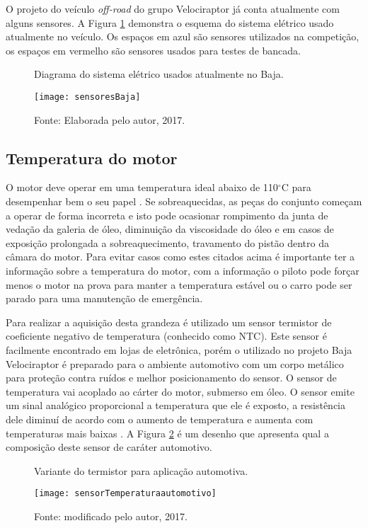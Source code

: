 O projeto do veículo \textit{off-road} do grupo Velociraptor já conta atualmente com alguns sensores. A Figura \ref{fig:sensoresBaja} demonstra o esquema do sistema elétrico usado atualmente no veículo. Os espaços em azul são sensores utilizados na competição, os espaços em vermelho são sensores usados para testes de bancada. 


\begin{figure}[!htb]
	\centering
		\caption{Diagrama do sistema elétrico usados atualmente no Baja.}
		\texttt{[image: sensoresBaja]} 
		\caption*{Fonte: Elaborada pelo autor, 2017.}
		\label{fig:sensoresBaja}
\end{figure} 

\subsection{Temperatura do motor}

O motor deve operar em uma temperatura ideal abaixo de 110$^\circ$C para desempenhar bem o seu papel \cite{Fraden2016}. Se sobreaquecidas, as peças do conjunto começam a operar de forma incorreta e isto pode ocasionar rompimento da junta de vedação da galeria de óleo, diminuição da viscosidade do óleo e em casos de exposição prolongada a sobreaquecimento, travamento do pistão dentro da câmara do motor. Para evitar casos como estes citados acima é importante ter a informação sobre a temperatura do motor, com a informação o piloto pode forçar menos o motor na prova para manter a temperatura estável ou o carro pode ser parado para uma manutenção de emergência.

Para realizar a aquisição desta grandeza é utilizado um sensor termistor de coeficiente negativo de temperatura (conhecido como NTC). Este sensor é facilmente encontrado em lojas de eletrônica, porém o utilizado no projeto Baja Velociraptor é preparado para o ambiente automotivo com um corpo metálico para proteção contra ruídos e melhor posicionamento do sensor. O sensor de temperatura vai acoplado ao cárter do motor, submerso em óleo. O sensor emite um sinal analógico proporcional a temperatura que ele é exposto, a resistência dele diminuí de acordo com o aumento de temperatura e aumenta com temperaturas mais baixas \cite{Fraden2016}. A Figura \ref{fig:sensorTemperaturaautomotivo} é um desenho que apresenta qual a composição deste sensor de caráter automotivo.   

\begin{figure}[!htb]
	\centering
		\caption{Variante do termistor para aplicação automotiva.}
		\texttt{[image: sensorTemperaturaautomotivo]} 
		\caption*{Fonte:\cite{sensortempauto} modificado pelo autor, 2017.}
		\label{fig:sensorTemperaturaautomotivo}
\end{figure} 



